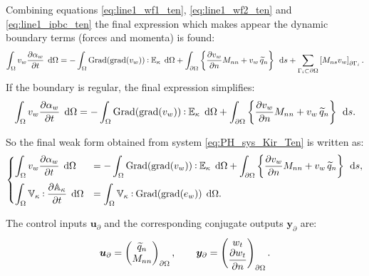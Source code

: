 \documentclass[preprint,12pt]{elsarticle}
\def\onedot{$\mathsurround0pt\ldotp$}
\def\cddot{%
	\mathbin{\vcenter{\baselineskip.67ex
			\hbox{\onedot}\hbox{\onedot}}%
}}
\begin{document}
Combining equations \eqref{eq:line1_wf1_ten}, \eqref{eq:line1_wf2_ten} and \eqref{eq:line1_ipbc_ten} the final expression which makes appear the dynamic boundary terms (forces and momenta) is found:
\begin{equation}
\int_{\Omega} v_w \diffp{\alpha_w}{t} \, \d\Omega  =  -  \int_{\Omega} \mathrm{Grad}(\mathrm{grad}(v_w))  \cddot \mathbb{E}_{\kappa} \, \d\Omega  +  \int_{\partial \Omega} \left\{ \diffp{v_w}{n} M_{nn}  + v_w \, \widetilde{q}_n \right\}  \, \d{s}  + \sum_{\Gamma_{i} \subset \partial \Omega} \left[ M_{ns} v_w \right]_{\partial \Gamma_i}.
\end{equation}
If the boundary is regular, the final expression simplifies:  
\begin{equation}
\int_{\Omega} v_w \diffp{\alpha_w}{t}  \, \d\Omega =  -  \int_{\Omega} \mathrm{Grad}(\mathrm{grad}(v_w))  \cddot \mathbb{E}_{\kappa} \, \d\Omega +  \int_{\partial \Omega} \left\{ \diffp{v_w}{n} M_{nn}  + v_w \, \widetilde{q}_n \right\} \, \d{s}. 
\end{equation}

So the final weak form obtained from system \eqref{eq:PH_sys_Kir_Ten} is written as:
\begin{equation}
\label{eq:WF_Kir_Dyn}
\begin{cases}
\displaystyle\int_{\Omega} v_w \diffp{\alpha_w}{t} \, \d\Omega  &=  -  \displaystyle\int_{\Omega} \mathrm{Grad}(\mathrm{grad}(v_w))  \cddot \mathbb{E}_{\kappa} \, \d\Omega +  \displaystyle\int_{\partial \Omega} \left\{ \diffp{v_w}{n} M_{nn}  + v_w \, \widetilde{q}_n \right\}   \, \d{s},  \vspace{2mm}\\
\displaystyle\int_{\Omega} \mathbb{V}_{\kappa} \cddot \diffp{\mathbb{A}_{\kappa}}{t} \, \d\Omega &= \displaystyle\int_{\Omega} \mathbb{V}_{\kappa} \cddot \mathrm{Grad}(\mathrm{grad}(e_w)) \, \d\Omega. 
\end{cases}
\end{equation}

The control inputs $\bm{u}_\partial$ and the corresponding conjugate outputs $\bm{y}_\partial$ are:
\[\bm{u}_\partial = 
\begin{pmatrix}
\widetilde{q}_n \\
M_{nn} \\
\end{pmatrix}_{\partial \Omega}, \qquad
\bm{y}_\partial = 
\begin{pmatrix}
w_t \\
\displaystyle \diffp{w_t}{n} \\
\end{pmatrix}_{\partial \Omega}.
\]
\end{document}
